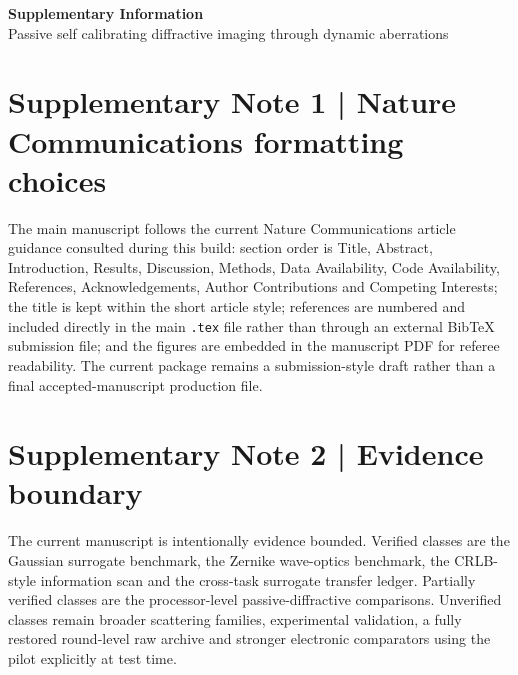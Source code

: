 \documentclass[11pt]{article}
\begin{document}
\begin{center}
{\LARGE \textbf{Supplementary Information}}\\[0.5em]
{\large Passive self calibrating diffractive imaging through dynamic aberrations}
\end{center}

\section*{Supplementary Note 1 | Nature Communications formatting choices}
The main manuscript follows the current Nature Communications article guidance consulted during this build: section order is Title, Abstract, Introduction, Results, Discussion, Methods, Data Availability, Code Availability, References, Acknowledgements, Author Contributions and Competing Interests; the title is kept within the short article style; references are numbered and included directly in the main \texttt{.tex} file rather than through an external BibTeX submission file; and the figures are embedded in the manuscript PDF for referee readability. The current package remains a submission-style draft rather than a final accepted-manuscript production file.

\section*{Supplementary Note 2 | Evidence boundary}
The current manuscript is intentionally evidence bounded. Verified classes are the Gaussian surrogate benchmark, the Zernike wave-optics benchmark, the CRLB-style information scan and the cross-task surrogate transfer ledger. Partially verified classes are the processor-level passive-diffractive comparisons. Unverified classes remain broader scattering families, experimental validation, a fully restored round-level raw archive and stronger electronic comparators using the pilot explicitly at test time.
\end{document}
